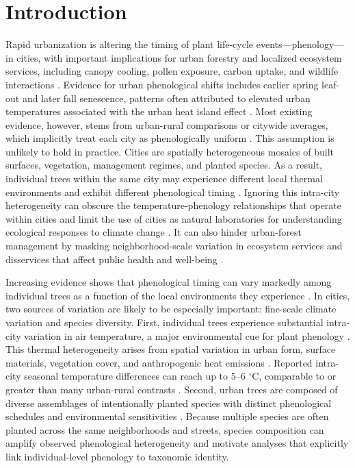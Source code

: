 \section{Introduction}
Rapid urbanization is altering the timing of plant life-cycle events—phenology—in cities, with important implications for urban forestry and localized ecosystem services, including canopy cooling, pollen exposure, carbon uptake, and wildlife interactions \citep{Yang2023GCB, Zhou2022NCC}. Evidence for urban phenological shifts includes earlier spring leaf-out and later fall senescence, patterns often attributed to elevated urban temperatures associated with the urban heat island effect \citep{Kabano2021LUP, Zhang2006JGRB}. Most existing evidence, however, stems from urban-rural comparisons or citywide averages, which implicitly treat each city as phenologically uniform \citep{Kabano2021LUP, Li2017GCB, Meng2020PNAS, Wang2019NatEcoEvol, Zhang2006JGRB}. This assumption is unlikely to hold in practice. Cities are spatially heterogeneous mosaics of built surfaces, vegetation, management regimes, and planted species. As a result, individual trees within the same city may experience different local thermal environments and exhibit different phenological timing \citep{Wu2025NatCommun}. Ignoring this intra-city heterogeneity can obscure the temperature-phenology relationships that operate within cities and limit the use of cities as natural laboratories for understanding ecological responses to climate change \citep{Zhou2022NCC}. It can also hinder urban-forest management by masking neighborhood-scale variation in ecosystem services and disservices that affect public health and well-being \citep{Crawford2024ERL, Katz2019STOTEN, Song2025SRS}. 

Increasing evidence shows that phenological timing can vary markedly among individual trees as a function of the local environments they experience \citep{Christmann2023UrbanEcosyst, Wohlfahrt2019NatEcoEvol, Wu2024NCC, Zellweger2020Science}. In cities, two sources of variation are likely to be especially important: fine-scale climate variation and species diversity. First, individual trees experience substantial intra-city variation in air temperature, a major environmental cue for plant phenology \citep{penuelas_phenology_2009, piao_plant_2019, Wohlfahrt2019NatEcoEvol}. This thermal heterogeneity arises from spatial variation in urban form, surface materials, vegetation cover, and anthropogenic heat emissions \citep{Stewart2012BAMS}. Reported intra-city seasonal temperature differences can reach up to 5--6 $^\circ$C, comparable to or greater than many urban-rural contrasts \citep{Cao2021LUP, Hart2009TAC, Johnson2020UrbanClimate, Kong2025ERL, Kousis2021ScientificReports, Naserikia2023STOTEN, Venter2020RSE}. Second, urban trees are composed of diverse assemblages of intentionally planted species with distinct phenological schedules and environmental sensitivities \citep{Gasparovic2023Forests, Parece2018UrbanSci}. Because multiple species are often planted across the same neighborhoods and streets, species composition can amplify observed phenological heterogeneity and motivate analyses that explicitly link individual-level phenology to taxonomic identity.

